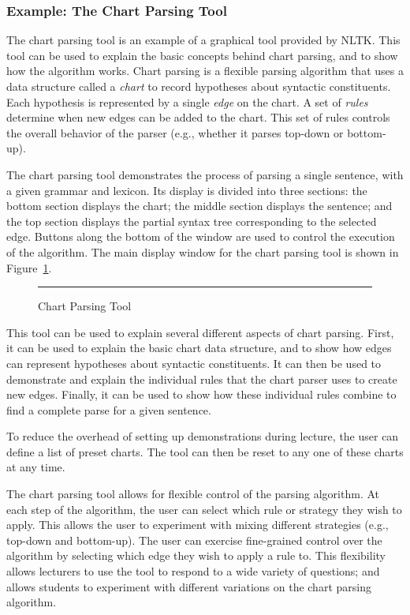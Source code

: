 \documentclass[11pt]{article}
\begin{document}
\subsubsection*{Example: The Chart Parsing Tool}

The chart parsing tool is an example of a graphical tool provided by
NLTK.  This tool can be used to explain the basic concepts behind
chart parsing, and to show how the algorithm works.  Chart parsing is
a flexible parsing algorithm that uses a data structure called a
\emph{chart} to record hypotheses about syntactic constituents.  Each
hypothesis is represented by a single \emph{edge} on the chart.  A set
of \emph{rules} determine when new edges can be added to the chart.
This set of rules controls the overall behavior of the parser (e.g.,
whether it parses top-down or bottom-up).

The chart parsing tool demonstrates the process of parsing a single
sentence, with a given grammar and lexicon.  Its display is divided
into three sections: the bottom section displays the chart; the middle
section displays the sentence; and the top section displays the
partial syntax tree corresponding to the selected edge.  Buttons along
the bottom of the window are used to control the execution of the
algorithm.  The main display window for the chart parsing tool is
shown in Figure~\ref{fig:chartparse}.   

\begin{figure}
\centerline{}
\caption{Chart Parsing Tool}\label{fig:chartparse}
\vspace*{2ex}\hrule
\end{figure}

This tool can be used to explain several different aspects of chart
parsing.  First, it can be used to explain the basic chart data
structure, and to show how edges can represent hypotheses about
syntactic constituents.  It can then be used to demonstrate and
explain the individual rules that the chart parser uses to create new
edges.  Finally, it can be used to show how these individual rules
combine to find a complete parse for a given sentence.

To reduce the overhead of setting up demonstrations during lecture,
the user can define a list of preset charts.  The tool can then be
reset to any one of these charts at any time.

The chart parsing tool allows for flexible control of the parsing
algorithm.  At each step of the algorithm, the user can select which
rule or strategy they wish to apply.  This allows the user to
experiment with mixing different strategies (e.g., top-down and
bottom-up).  The user can exercise fine-grained control over the
algorithm by selecting which edge they wish to apply a rule to.  This
flexibility allows lecturers to use the tool to respond to a wide
variety of questions; and allows students to experiment with different
variations on the chart parsing algorithm.
\end{document}
